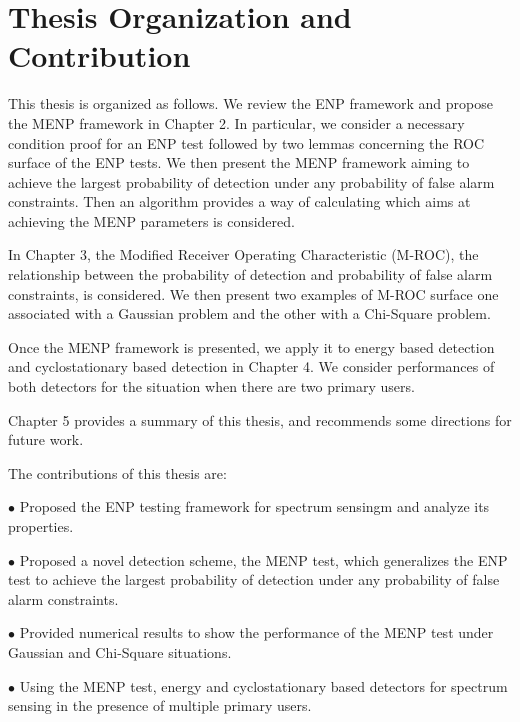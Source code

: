\section{Thesis Organization and Contribution}
This thesis is organized as follows. We review the ENP framework and propose the MENP framework in Chapter 2. In particular,  we consider  a necessary condition proof for an  ENP test followed by  two lemmas concerning the ROC surface of the ENP tests. 
We then present the MENP framework aiming to  achieve the largest probability of detection  under any probability of false alarm constraints.
Then an algorithm provides a way of calculating which aims at achieving the MENP parameters is considered. 

In Chapter 3, the Modified Receiver Operating Characteristic (M-ROC), the relationship between the probability of detection and probability of false alarm constraints, is considered.  We then present two examples of M-ROC surface one associated with a Gaussian problem and the other with a Chi-Square problem. 

Once the MENP framework is presented, we apply it to energy based detection and cyclostationary based detection in Chapter 4. We consider  performances of both detectors for the situation when there are two primary users.  

Chapter 5 provides a summary of this thesis, and recommends some directions for future work.  

The contributions of this thesis are:

$\bullet$ Proposed the ENP testing framework for spectrum sensingm and analyze its properties.  

$\bullet$ Proposed a novel detection scheme,  the MENP test, which generalizes the ENP  test to  achieve the largest probability of detection under any probability of false alarm constraints. 

$\bullet$ Provided numerical results to show the performance of the MENP test under Gaussian and Chi-Square situations. 

$\bullet$ Using the MENP test, energy and cyclostationary based detectors for spectrum sensing in the presence of multiple primary users. 
